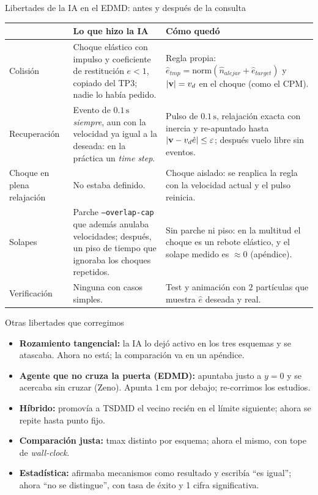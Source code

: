 \begin{frame}{Libertades de la IA en el EDMD: antes y después de la consulta}
  \footnotesize
  \begin{tabularx}{\textwidth}{@{}p{}XX@{}}
    & \textbf{Lo que hizo la IA} & \textbf{Cómo quedó} \\ \midrule
    Colisión
      & Choque elástico con impulso y coeficiente de restitución $e<1$, copiado del TP3; nadie lo había pedido.
      & Regla propia: $\hat e_{tmp}=\mathrm{norm}(\hat n_{alejar}+\hat e_{target})$ y $|\mathbf{v}|=v_d$ en el choque (como el CPM). \\
    Recuperación
      & Evento de $0.1\,\mathrm{s}$ \emph{siempre}, aun con la velocidad ya igual a la deseada: en la práctica un \emph{time step}.
      & Pulso de $0.1\,\mathrm{s}$, relajación exacta con inercia y re-apuntado hasta $|\mathbf{v}-v_d\hat e|\le\varepsilon$; después vuelo libre sin eventos. \\
    Choque en plena relajación
      & No estaba definido.
      & Choque aislado: se reaplica la regla con la velocidad actual y el pulso reinicia. \\
    Solapes
      & Parche \texttt{--overlap-cap} que además anulaba velocidades; después, un piso de tiempo que ignoraba los choques repetidos.
      & Sin parche ni piso: en la multitud el choque es un rebote elástico, y el solape medido es $\approx 0$ (apéndice). \\
    Verificación
      & Ninguna con casos simples.
      & Test y animación con $2$ partículas que muestra $\hat e$ deseada y real. \\
  \end{tabularx}
\end{frame}

\begin{frame}{Otras libertades que corregimos}
  \footnotesize
  \begin{itemize}
    \item \textbf{Rozamiento tangencial:} la IA lo dejó activo en los tres esquemas y se atascaba. Ahora no está; la comparación va en un apéndice.
    \item \textbf{Agente que no cruza la puerta (EDMD):} apuntaba justo a $y=0$ y se acercaba sin cruzar (Zeno). Apunta $1\,\mathrm{cm}$ por debajo; re-corrimos los estudios.
    \item \textbf{Híbrido:} promovía a TSDMD el vecino recién en el límite siguiente; ahora se repite hasta punto fijo.
    \item \textbf{Comparación justa:} tmax distinto por esquema; ahora el mismo, con tope de \emph{wall-clock}.
    \item \textbf{Estadística:} afirmaba mecanismos como resultado y escribía ``es igual''; ahora ``no se distingue'', con tasa de éxito y 1 cifra significativa.
  \end{itemize}
\end{frame}


